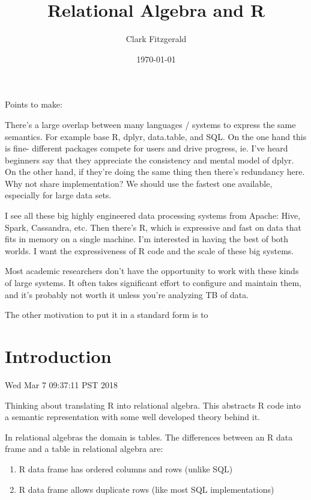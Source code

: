 \documentclass[12pt]{article}
\begin{document}
\title{Relational Algebra and R}
\date{\today}
\author{Clark Fitzgerald}
\maketitle

Points to make:

There's a large overlap between many languages / systems to express the
same semantics. For example base R, dplyr, data.table, and SQL.
On the one hand this is fine- different packages compete for users and
drive progress, ie. I've heard beginners say that they appreciate the
consistency and mental model of dplyr.  On the other hand, if they're doing
the same thing then there's redundancy here.  Why not share implementation?
We should use the fastest one available, especially for large data sets.

I see all these big highly engineered data processing systems
from Apache: Hive, Spark, Cassandra, etc. Then there's R, which is
expressive and fast on data that fits in memory on a single machine.
I'm interested in having the best of both worlds. I want the expressiveness
of R code and the scale of these big systems.

Most academic researchers don't have the opportunity to work with
these kinds of large systems. It often takes significant effort to
configure and maintain them, and it's probably not worth it unless you're
analyzing TB of data.


The other motivation to put it in a standard form is to 

\section{Introduction}

Wed Mar  7 09:37:11 PST 2018

Thinking about translating R into relational algebra.
This abstracts R code into a semantic representation with some well
developed theory behind it.

In relational algebras the domain is tables. The differences between an R
data frame and a table in relational algebra are:

\begin{enumerate}
    \item R data frame has ordered columns and rows (unlike SQL)
    \item R data frame allows duplicate rows (like most SQL implementations)
\end{enumerate}
\end{document}
